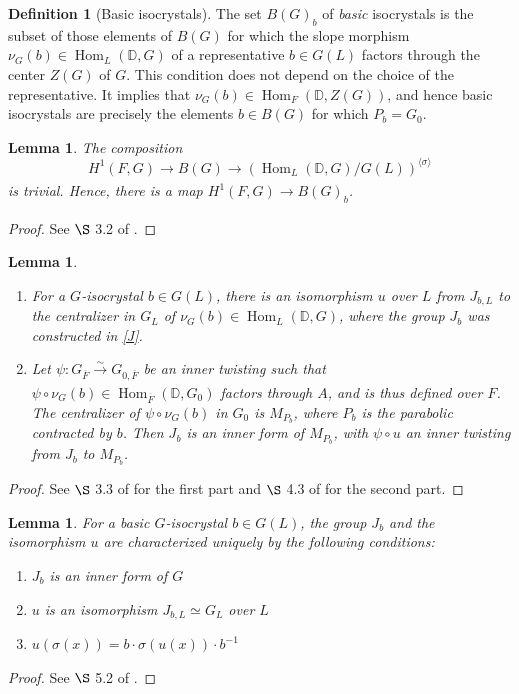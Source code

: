 \documentclass[11pt,a4paper]{article}
\theoremstyle{definition}
\newtheorem{D}[shared]{Definition}
\theoremstyle{plain}
\newtheorem{Le}[shared]{Lemma}
\theoremstyle{remark}
\theoremstyle{plain}
\DeclareMathOperator{\Hom}{Hom}
\begin{document}
\begin{D}[Basic isocrystals]\label{basicisocrystaldef}
    The set $B(G)_b$ of \textit{basic} isocrystals is the subset of those elements of $B(G)$ for which the slope morphism $\nu_G(b) \in \Hom_L(\mathbb{D}, G)$ of a representative $b \in G(L)$ factors through the center $Z(G)$ of $G$. This condition does not depend on the choice of the representative. It implies that $\nu_G(b) \in \Hom_F(\mathbb{D}, Z(G))$, and hence basic isocrystals are precisely the elements $b \in B(G)$ for which $P_b = G_0$.
\end{D}

\begin{Le}\label{basicandcohomlemma}
    The composition
    $$H^1(F,G) \xrightarrow[]{} B(G) \xrightarrow[]{} (\Hom_L(\mathbb{D}, G)/G(L))^{\langle \sigma \rangle}$$
    is trivial. Hence, there is a map $H^1(F,G) \xrightarrow[]{} B(G)_b$.
\end{Le}
\begin{proof}
    See $\S$ 3.2 of \cite{MR1485921}.
\end{proof}

\begin{Le}\label{leviofcontracted}
\begin{enumerate}
    \item For a $G$-isocrystal $b \in G(L)$, there is an isomorphism $u$ over $L$ from $J_{b,L}$ to the centralizer in $G_L$ of $\nu_G(b) \in \Hom_L(\mathbb{D}, G)$, where the group $J_b$ was constructed in \ref{J}.
    \item Let $\psi: G_{\overline{F}} \xrightarrow[]{\sim} G_{0,\overline{F}}$ be an inner twisting such that $\psi \circ \nu_G(b) \in \Hom_{\overline{F}}(\mathbb{D}, G_0)$ factors through $A$, and is thus defined over $F$. The centralizer of $\psi \circ \nu_G(b)$ in $G_0$ is $M_{P_b}$, where $P_b$ is the parabolic contracted by $b$. Then $J_b$ is an inner form of $M_{P_b}$, with $\psi \circ u$ an inner twisting from $J_b$ to $M_{P_b}$.
\end{enumerate} 
\end{Le}
\begin{proof}
    See $\S$ 3.3 of \cite{MR1485921} for the first part and $\S$ 4.3 of \cite{MR1485921} for the second part.
\end{proof}

\begin{Le}\label{characterizationJ}
    For a basic $G$-isocrystal $b \in G(L)$, the group $J_b$ and the isomorphism $u$ are characterized uniquely by the following conditions:
    \begin{enumerate}
        \item $J_b$ is an inner form of $G$
        \item $u$ is an isomorphism $J_{b,L} \simeq G_L$ over $L$
        \item $u(\sigma(x)) = b \cdot \sigma(u(x)) \cdot b^{-1}$
    \end{enumerate}
\end{Le}
\begin{proof}
    See $\S$ 5.2 of \cite{MR809866}.
\end{proof}
\end{document}
